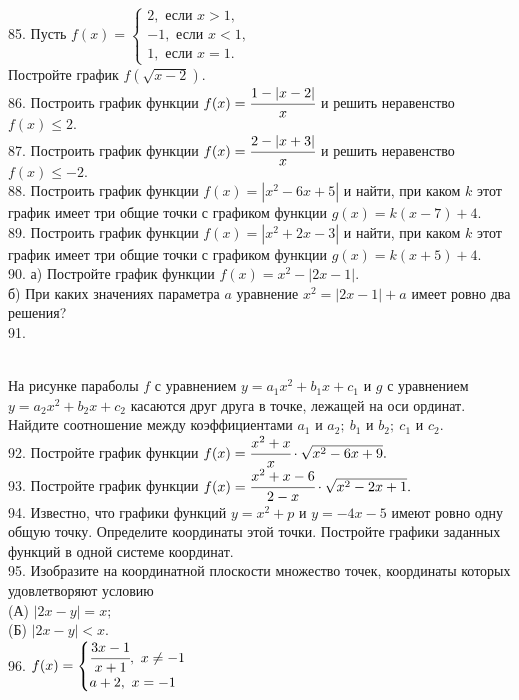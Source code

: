 85. Пусть $f(x)=\begin{cases} 2, \text{ если } x>1,\\ -1, \text{ если } x<1,\\ 1, \text{ если } x=1.\end{cases}$\\
Постройте график $f(\sqrt{x-2}).$\\
86. Построить график функции $f(x)=\cfrac{1-|x-2|}{x}$ и решить неравенство $f(x)\leqslant 2.$\\
87. Построить график функции $f(x)=\cfrac{2-|x+3|}{x}$ и решить неравенство $f(x)\leqslant -2.$\\
88. Построить график функции $f(x)=|x^2-6x+5|$ и найти, при каком $k$ этот график имеет три общие точки с графиком функции $g(x)=k(x-7)+4.$\\
89. Построить график функции $f(x)=|x^2+2x-3|$ и найти, при каком $k$ этот график имеет три общие точки с графиком функции $g(x)=k(x+5)+4.$\\
90. а) Постройте график функции $f(x)=x^2-|2x-1|.$\\
б) При каких значениях параметра $a$ уравнение $x^2=|2x-1|+a$ имеет ровно два решения?\\
91. \begin{figure}[ht!]
\end{figure}\\
На рисунке параболы $f$ с уравнением $y=a_1 x^2+b_1x+c_1$ и $g$ с уравнением $y=a_2 x^2+b_2x+c_2$ касаются друг друга в точке, лежащей на оси ординат. Найдите соотношение между коэффициентами $a_1$ и $a_2;\ b_1$ и $b_2;\ c_1$ и $c_2.$\\
92. Постройте график функции $f(x)=\cfrac{x^2+x}{x}\cdot\sqrt{x^2-6x+9}.$\\
93. Постройте график функции $f(x)=\cfrac{x^2+x-6}{2-x}\cdot\sqrt{x^2-2x+1}.$\\
94. Известно, что графики функций $y=x^2+p$ и $y=-4x-5$ имеют ровно одну общую точку. Определите координаты этой точки. Постройте графики заданных функций в одной системе координат.\\
95. Изобразите на координатной плоскости множество точек, координаты которых удовлетворяют условию\\
(А) $|2x-y|=x;$\\
(Б) $|2x-y|<x.$\\
96. $f(x)=\begin{cases} \cfrac{3x-1}{x+1},\ x\neq-1\\a+2,\ x=-1 \end{cases}$\\
